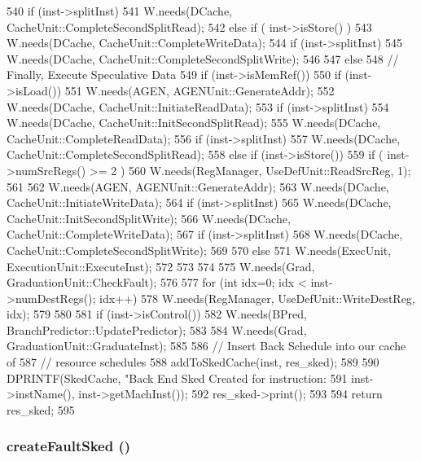 \begin{DoxyCode}
{{{540             if (inst->splitInst)
541                 W.needs(DCache, CacheUnit::CompleteSecondSplitRead);
542         } else if ( inst->isStore() ) {
543             W.needs(DCache, CacheUnit::CompleteWriteData);
544             if (inst->splitInst)
545                 W.needs(DCache, CacheUnit::CompleteSecondSplitWrite);
546         }
547     } else {
548         // Finally, Execute Speculative Data
549         if (inst->isMemRef()) {
550             if (inst->isLoad()) {
551                 W.needs(AGEN, AGENUnit::GenerateAddr);
552                 W.needs(DCache, CacheUnit::InitiateReadData);
553                 if (inst->splitInst)
554                     W.needs(DCache, CacheUnit::InitSecondSplitRead);
555                 W.needs(DCache, CacheUnit::CompleteReadData);
556                 if (inst->splitInst)
557                     W.needs(DCache, CacheUnit::CompleteSecondSplitRead);
558             } else if (inst->isStore()) {
559                 if ( inst->numSrcRegs() >= 2 ) {
560                     W.needs(RegManager, UseDefUnit::ReadSrcReg, 1);
561                 }
562                 W.needs(AGEN, AGENUnit::GenerateAddr);
563                 W.needs(DCache, CacheUnit::InitiateWriteData);
564                 if (inst->splitInst)
565                     W.needs(DCache, CacheUnit::InitSecondSplitWrite);
566                 W.needs(DCache, CacheUnit::CompleteWriteData);
567                 if (inst->splitInst)
568                     W.needs(DCache, CacheUnit::CompleteSecondSplitWrite);
569             }
570         } else {
571             W.needs(ExecUnit, ExecutionUnit::ExecuteInst);
572         }
573     }
574 
575     W.needs(Grad, GraduationUnit::CheckFault);
576 
577     for (int idx=0; idx < inst->numDestRegs(); idx++) {
578         W.needs(RegManager, UseDefUnit::WriteDestReg, idx);
579     }
580 
581     if (inst->isControl())
582         W.needs(BPred, BranchPredictor::UpdatePredictor);
583 
584     W.needs(Grad, GraduationUnit::GraduateInst);
585 
586     // Insert Back Schedule into our cache of
587     // resource schedules
588     addToSkedCache(inst, res_sked);
589 
590     DPRINTF(SkedCache, "Back End Sked Created for instruction: %
591             inst->instName(), inst->getMachInst());
592     res_sked->print();
593 
594     return res_sked;
595 }
\end{DoxyCode}
\hypertarget{classInOrderCPU_ab4e3b37bc6ae8d0dde3a66c9a8b28874}{
\subsubsection[{createFaultSked}]{ createFaultSked ()}}
\label{classInOrderCPU_ab4e3b37bc6ae8d0dde3a66c9a8b28874}



